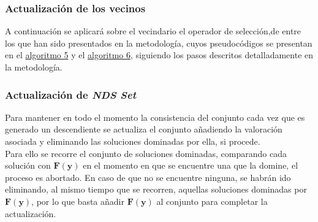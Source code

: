 \subsubsection{Actualización de los vecinos}

A continuación se aplicará sobre el vecindario el operador de selección,de entre los que han sido presentados en la metodología, cuyos pseudocódigos se presentan en el \hyperref[alg:5]{algoritmo 5} y el \hyperref[alg:6]{algoritmo 6}, siguiendo los pasos descritos detalladamente en la metodología.\\


\subsubsection{Actualización de \textit{NDS Set}}

Para mantener en todo el momento la consistencia del conjunto cada vez que es generado un descendiente se actualiza el conjunto añadiendo la valoración asociada y eliminando las soluciones dominadas por ella, si procede.\\

Para ello se recorre el conjunto de soluciones dominadas, comparando cada solución con $\boldsymbol{F}(\boldsymbol{y})$ en el momento en que se encuentre una que la domine, el proceso es abortado. En caso de que no se encuentre ninguna, se habrán ido eliminando, al mismo tiempo que se recorren, aquellas soluciones dominadas por $\boldsymbol{F}(\boldsymbol{y})$, por lo que basta añadir $\boldsymbol{F}(\boldsymbol{y})$ al conjunto para completar la actualización. \\


